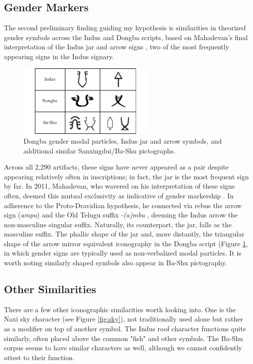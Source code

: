 \documentclass[11pt,a4paper,oneside]{report}
\begin{document}
\subsection{Gender Markers}
\noindent\hspace{1cm}
The second preliminary finding guiding my hypothesis is similarities in theorized gender symbols across the Indus and Dongba scripts, based on Mahadevan's final interpretation of the Indus jar and arrow signs \cite{mahadevan_dravidian_2014,mahadevan_indus_2011,mahadevan_interpreting_2015}, two of the most frequently appearing signs in the Indus signary. 

\begin{figure}[H] 
    \centering
    \includegraphics[width=0.6\textwidth]{Visualizations/Figures/Gender.pdf}
    \caption[Indus vs. Dongba Gender Marker Comparison Chart]{Dongba gender modal particles, Indus jar and arrow symbols, and additional similar Sanxingdui/Ba-Shu pictographs.}
    \label{fig:gender}
\end{figure}

Across all 2,290 artifacts, these signs have never appeared as a pair despite appearing relatively often in inscriptions; in fact, the jar is the most frequent sign by far. In 2011, Mahadevan, who wavered on his interpretation of these signs often, deemed this mutual exclusivity as indicative of gender markership \cite{mahadevan_indus_2011}. In adherence to the Proto-Dravidian hypothesis, he connected via rebus the arrow sign (\textit{ampu}) and the Old Telugu suffix \textit{-(a)mbu} \cite{sastri_historical_1969}, deeming the Indus arrow the non-masculine singular suffix. Naturally, its counterpart, the jar, falls as the masculine suffix. The phallic shape of the jar and, more distantly, the triangular shape of the arrow mirror equivalent iconography in the Dongba script (Figure \ref{fig:gender}, in which gender signs are typically used as non-verbalized modal particles. It is worth noting similarly shaped symbols also appear in Ba-Shu pictography.

\subsection{Other Similarities}
\noindent\hspace{1cm}
There are a few other iconographic similarities worth looking into. One is the Naxi sky character (see Figure \ref{fig:sky}), not traditionally used alone but rather as a modifier on top of another symbol. The Indus roof character functions quite similarly, often placed above the common "fish" and other symbols. The Ba-Shu corpus seems to have similar characters as well, although we cannot confidently attest to their function.
\end{document}
